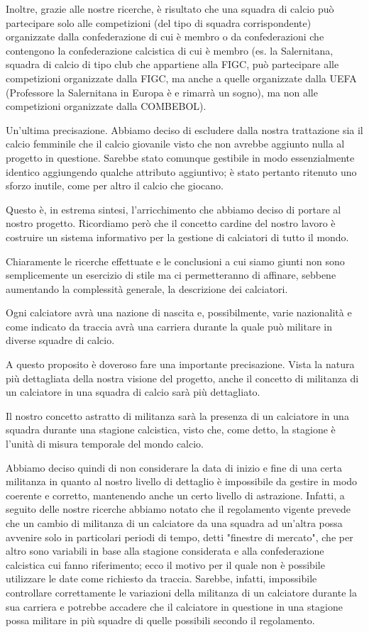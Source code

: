 Inoltre, grazie alle nostre ricerche, è risultato che una squadra di calcio può partecipare
solo alle competizioni (del tipo di squadra corrispondente) organizzate dalla confederazione
di cui è membro o da confederazioni che contengono la confederazione calcistica di cui
è membro (es. la Salernitana, squadra di calcio di tipo club che appartiene alla FIGC,
può partecipare alle competizioni organizzate dalla FIGC, ma anche a quelle organizzate
dalla UEFA (Professore la Salernitana in Europa è e rimarrà un sogno),
ma non alle competizioni organizzate dalla COMBEBOL).

Un'ultima precisazione. Abbiamo deciso di escludere dalla nostra trattazione sia il calcio
femminile che il calcio giovanile visto che non avrebbe aggiunto nulla al progetto in questione.
Sarebbe stato comunque gestibile in modo essenzialmente identico aggiungendo qualche attributo
aggiuntivo; è stato pertanto ritenuto uno sforzo inutile, come per altro il calcio che giocano.
\bigskip
\bigskip

Questo è, in estrema sintesi, l'arricchimento che abbiamo deciso di portare al nostro progetto.
Ricordiamo però che il concetto cardine del nostro lavoro è costruire un sistema informativo
per la gestione di calciatori di tutto il mondo.

Chiaramente le ricerche effettuate e le conclusioni a cui siamo giunti non sono semplicemente
un esercizio di stile ma ci permetteranno di affinare, sebbene aumentando la complessità
generale, la descrizione dei calciatori.

\bigskip
\bigskip

Ogni calciatore avrà una nazione di nascita e, possibilmente, varie nazionalità e
come indicato da traccia avrà una carriera durante la quale può militare in diverse
squadre di calcio.

A questo proposito è doveroso fare una importante precisazione. Vista la natura più dettagliata
della nostra visione del progetto, anche il concetto di militanza di un calciatore in una squadra
di calcio sarà più dettagliato.

Il nostro concetto astratto di militanza sarà la presenza di un calciatore in una squadra
durante una stagione calcistica, visto che, come detto, la stagione è l'unità di misura
temporale del mondo calcio.

Abbiamo deciso quindi di non considerare la data di inizio e fine di una certa militanza in
quanto al nostro livello di dettaglio è impossibile da gestire in modo coerente e corretto,
mantenendo anche un certo livello di astrazione.
Infatti, a seguito delle nostre ricerche abbiamo notato che il regolamento vigente
prevede che un cambio di militanza di un calciatore da una squadra ad un'altra
possa avvenire solo in particolari periodi di tempo, detti "finestre di mercato",
che per altro sono variabili in base alla stagione considerata e alla confederazione
calcistica cui fanno riferimento; ecco il motivo per il quale non è possibile utilizzare
le date come richiesto da traccia.
Sarebbe, infatti, impossibile controllare correttamente le variazioni della militanza di un calciatore
durante la sua carriera e potrebbe accadere che il calciatore in questione in una stagione
possa militare in più squadre di quelle possibili secondo il regolamento.

